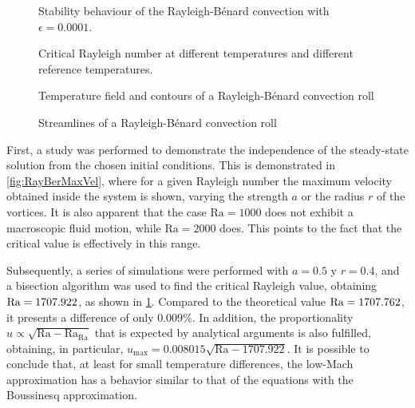 \begin{figure}[bt]
	\centering
	\caption{Stability behaviour of the Rayleigh-Bénard convection with $\epsilon = 0.0001$.} \label{fig:ReyBerCritRa}
\end{figure}
\begin{figure}[bt]
	\pgfplotsset{width=0.45\textwidth, compat=1.3}
	\centering
\caption{Critical Rayleigh number at different temperatures and different reference temperatures.}\label{fig:RayBenardTemperatureRaPlot}
\end{figure}
\begin{figure}[h]
	\centering
	\pgfplotsset{width=0.31\textwidth, compat=1.3}
	\par\bigskip
	\caption{Temperature field and contours of a Rayleigh-Bénard convection roll} \label{fig:RayBenTemperatureField}
\end{figure}
\begin{figure}[h!]
	\centering
	\pgfplotsset{width=0.31\textwidth, compat=1.3}
	\par\bigskip
	\caption{Streamlines of a Rayleigh-Bénard convection roll} \label{fig:RayBenStreamlines}
\end{figure}
First, a study was performed to demonstrate the independence of the steady-state solution from the chosen initial conditions. This is demonstrated in \cref{fig:RayBerMaxVel}, where for a given Rayleigh number the maximum velocity obtained inside the system is shown, varying the strength $a$ or the radius $r$ of the vortices. It is also apparent that the case $\text{Ra} = 1000$ does not exhibit a macroscopic fluid motion, while $\text{Ra} = 2000$ does. This points to the fact that the critical value is effectively in this range. 

Subsequently, a series of simulations were performed with $a = 0.5$ y $r = 0.4$, and a bisection algorithm was used to find the critical Rayleigh value, obtaining $\text{Ra} = 1707.922$, as shown in \cref{fig:ReyBerCritRa}. Compared to the theoretical value $\text{Ra} = 1707.762$, it presents a difference of only $0.009\%$. In addition, the proportionality  $u \propto \sqrt{\text{Ra}- \text{Ra}_\text{Ra}}$  that is expected by analytical arguments is also fulfilled, obtaining, in particular, $u_{\text{max}}  = 0.008015\sqrt{\text{Ra} - 1707.922}$. It is possible to conclude that, at least for small temperature differences, the low-Mach approximation has a behavior similar to that of the equations with the Boussinesq approximation. 

